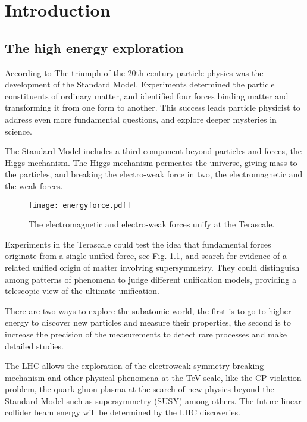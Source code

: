 \chapter{Introduction}
\section{The high energy exploration}
According to \cite{} The triumph of the 20th century particle physics was the development of the Standard Model. Experiments determined the particle constituents of ordinary matter, and identified four forces binding matter and transforming it from one form to another. This success leads particle physicist to address even more fundamental questions, and explore deeper mysteries in science.\par
The Standard Model includes a third component beyond particles and forces, the Higgs mechanism. The Higgs mechanism permeates the universe, giving mass to the particles, and breaking the electro-weak force in two, the electromagnetic and the weak forces.\par
\begin{figure}[!hbt]
\centering
\texttt{[image: energyforce.pdf]}\caption{The electromagnetic and electro-weak forces unify at the Terascale.}\label{f:energyforce}
\end{figure}
Experiments in the Terascale could test the idea that fundamental forces originate from a single unified force, see Fig. \ref{f:energyforce}, and search for evidence of a related unified origin of matter involving supersymmetry. They could distinguish among patterns of phenomena to judge different unification models, providing a telescopic view of the ultimate unification.\par
There are two ways to explore the subatomic world, the first is to go to higher energy to discover new particles and measure their properties, the second is to increase the precision of the measurements to detect rare processes and make detailed studies.\par
The LHC allows the exploration of the electroweak symmetry breaking mechanism and other physical phenomena at the TeV scale, like the CP violation problem, the quark gluon plasma at the search of new physics beyond the Standard Model such as supersymmetry (SUSY) among others. The future linear collider beam energy will be determined by the LHC discoveries.\par
